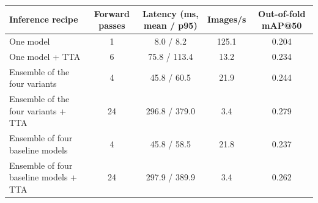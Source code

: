 \begin{tabular}{lcccc}
\toprule
Inference recipe & Forward passes & Latency (ms, mean / p95) & Images/s & Out-of-fold mAP@50 \\
\midrule
One model & 1 & 8.0 / 8.2 & 125.1 & 0.204 \\
One model + TTA & 6 & 75.8 / 113.4 & 13.2 & 0.234 \\
Ensemble of the four variants & 4 & 45.8 / 60.5 & 21.9 & 0.244 \\
Ensemble of the four variants + TTA & 24 & 296.8 / 379.0 & 3.4 & 0.279 \\
Ensemble of four baseline models & 4 & 45.8 / 58.5 & 21.8 & 0.237 \\
Ensemble of four baseline models + TTA & 24 & 297.9 / 389.9 & 3.4 & 0.262 \\
\bottomrule
\end{tabular}
